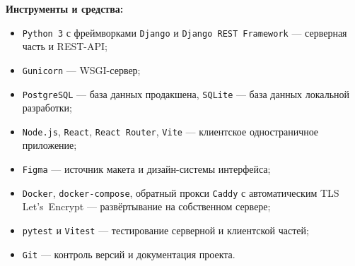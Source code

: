 \textbf{Инструменты и средства:}
\begin{itemize}
  \item \texttt{Python~3} с фреймворками \texttt{Django} и
        \texttt{Django REST Framework} — серверная часть и REST-API;
  \item \texttt{Gunicorn} — WSGI-сервер;
  \item \texttt{PostgreSQL} — база данных продакшена,
        \texttt{SQLite} — база данных локальной разработки;
  \item \texttt{Node.js}, \texttt{React}, \texttt{React Router},
        \texttt{Vite} — клиентское одностраничное приложение;
  \item \texttt{Figma} — источник макета и дизайн-системы интерфейса;
  \item \texttt{Docker}, \texttt{docker-compose}, обратный прокси
        \texttt{Caddy} с автоматическим TLS Let's~Encrypt —
        развёртывание на собственном сервере;
  \item \texttt{pytest} и \texttt{Vitest} — тестирование серверной и
        клиентской частей;
  \item \texttt{Git} — контроль версий и документация проекта.
\end{itemize}

\endinput
